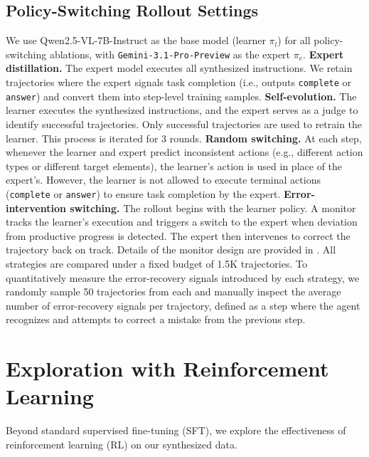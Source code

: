 \documentclass{article} %
\begin{document}
\subsection{Policy-Switching Rollout Settings}
\label{app:policy_switching_setting}
We use Qwen2.5-VL-7B-Instruct as the base model (learner $\pi_l$) for all policy-switching ablations, with \texttt{Gemini-3.1-Pro-Preview} as the expert $\pi_e$.
\textbf{Expert distillation.} The expert model executes all synthesized instructions. We retain trajectories where the expert signals task completion (i.e., outputs \texttt{complete} or \texttt{answer}) and convert them into step-level training samples.
\textbf{Self-evolution.} The learner executes the synthesized instructions, and the expert serves as a judge to identify successful trajectories. Only successful trajectories are used to retrain the learner. This process is iterated for 3 rounds.
\textbf{Random switching.} At each step, whenever the learner and expert predict inconsistent actions (e.g., different action types or different target elements), the learner's action is used in place of the expert's. However, the learner is not allowed to execute terminal actions (\texttt{complete} or \texttt{answer}) to ensure task completion by the expert.
\textbf{Error-intervention switching.} The rollout begins with the learner policy. A monitor tracks the learner's execution and triggers a switch to the expert when deviation from productive progress is detected. The expert then intervenes to correct the trajectory back on track.
Details of the monitor design are provided in .
All strategies are compared under a fixed budget of 1.5K trajectories.
To quantitatively measure the error-recovery signals introduced by each strategy, we randomly sample 50 trajectories from each and manually inspect the average number of error-recovery signals per trajectory, defined as a step where the agent recognizes and attempts to correct a mistake from the previous step.

\section{Exploration with Reinforcement Learning}
\label{app:rl}
Beyond standard supervised fine-tuning (SFT), we explore the effectiveness of reinforcement learning (RL) on our synthesized data.
\end{document}
